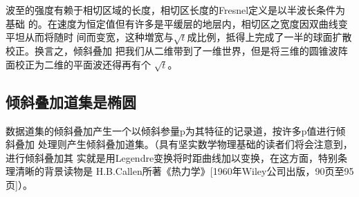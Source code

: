 波至的强度有赖于相切区域的长度，相切区长度的Fresnel定义是以半波长条件为基础
的。在速度为恒定值但有许多是平缓层的地层内，相切区之宽度因双曲线变平坦从而将随时
间而变宽，这种増宽与$\sqrt{t}$成比例，抵得上完成了一半的球面扩散校正。换言之，倾斜叠加
把我们从二维带到了一维世界，但是将三维的圆锥波阵面校正为二维的平面波还得再有个
$\sqrt{t}$。

\subsection{倾斜叠加道集是椭圆}
\label{sec:5.2.2}

数据道集的倾斜叠加产生一个以倾斜参量p为其特征的记录道，按许多p值进行倾斜叠加
处理则产生倾斜叠加道集。（具有坚实数学物理基础的读者们将会注意到，进行倾斜叠加其
实就是用Legendre变换将时距曲线加以变换，在这方面，特别条理清晰的背景读物是
H.B.Callen所著《热力学》[1960年Wiley公司出版，90页至95页]）。
